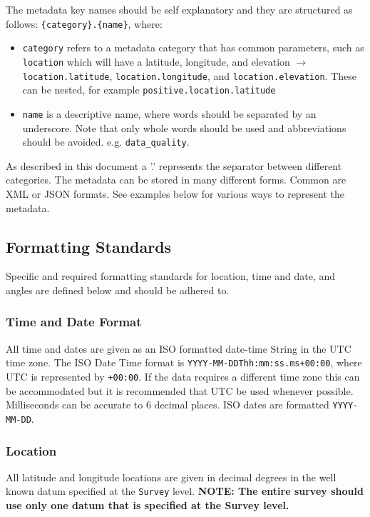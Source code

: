 \documentclass[12pt]{article}
\begin{document}
The metadata key names should be self explanatory and they are structured as follows: \verb|{category}.{name}|, where:
\begin{itemize}
	\item \verb|category| refers to a metadata category that has common parameters, such as \verb|location| which will have a latitude, longitude, and elevation $\longrightarrow$ \verb|location.latitude|, \verb|location.longitude|, and \verb|location.elevation|.  These can be nested, for example \verb|positive.location.latitude|
	\item \verb|name| is a descriptive name, where words should be separated by an underscore. Note that only whole words should be used and abbreviations should be avoided. e.g. \verb|data_quality|.  
\end{itemize}  

As described in this document a '.' represents the separator between different categories.  The metadata can be stored in many different forms.  Common are XML or JSON formats.  See examples below for various ways to represent the metadata.      

\subsection{Formatting Standards}

Specific and required formatting standards for location, time and date, and angles are defined below and should be adhered to.

\subsubsection{Time and Date Format}

All time and dates are given as an ISO formatted date-time String in the UTC time zone.  The ISO Date Time format is \verb|YYYY-MM-DDThh:mm:ss.ms+00:00|, where UTC is represented by \verb|+00:00|. If the data requires a different time zone this can be accommodated but it is recommended that UTC be used whenever possible. Milliseconds can be accurate to 6 decimal places.  ISO dates are formatted \verb|YYYY-MM-DD|. 

\subsubsection{Location}

All latitude and longitude locations are given in decimal degrees in the well known datum specified at the \verb|Survey| level. \textbf{NOTE: The entire survey should use only one datum that is specified at the Survey level.}
\end{document}
